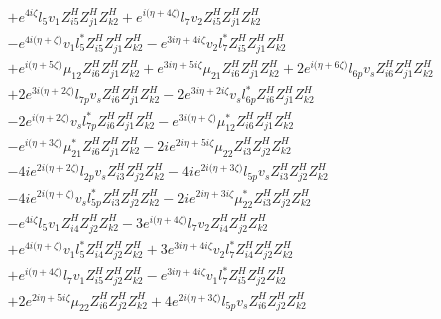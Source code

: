 \begin{align}
 &+e^{4 i \zeta } l_5 v_1 Z_{{i 5}}^{H} Z_{{j 1}}^{H} Z_{{k 2}}^{H} +e^{i \Big(\eta +4 \zeta \Big)} l_7 v_2 Z_{{i 5}}^{H} Z_{{j 1}}^{H} Z_{{k 2}}^{H} \nonumber \\ 
 &- e^{4 i \Big(\eta +\zeta \Big)} v_1 l_5^* Z_{{i 5}}^{H} Z_{{j 1}}^{H} Z_{{k 2}}^{H} - e^{3 i \eta +4 i \zeta } v_2 l_7^* Z_{{i 5}}^{H} Z_{{j 1}}^{H} Z_{{k 2}}^{H} \nonumber \\ 
 &+e^{i \Big(\eta +5 \zeta \Big)} \mu_{12} Z_{{i 6}}^{H} Z_{{j 1}}^{H} Z_{{k 2}}^{H} +e^{3 i \eta +5 i \zeta } \mu_{21} Z_{{i 6}}^{H} Z_{{j 1}}^{H} Z_{{k 2}}^{H} +2 e^{i \Big(\eta +6 \zeta \Big)} l_{6p} v_s Z_{{i 6}}^{H} Z_{{j 1}}^{H} Z_{{k 2}}^{H} \nonumber \\ 
 &+2 e^{3 i \Big(\eta +2 \zeta \Big)} l_{7p} v_s Z_{{i 6}}^{H} Z_{{j 1}}^{H} Z_{{k 2}}^{H} -2 e^{3 i \eta +2 i \zeta } v_s l_{6p}^* Z_{{i 6}}^{H} Z_{{j 1}}^{H} Z_{{k 2}}^{H} \nonumber \\ 
 &-2 e^{i \Big(\eta +2 \zeta \Big)} v_s l_{7p}^* Z_{{i 6}}^{H} Z_{{j 1}}^{H} Z_{{k 2}}^{H} - e^{3 i \Big(\eta +\zeta \Big)} \mu_{12}^* Z_{{i 6}}^{H} Z_{{j 1}}^{H} Z_{{k 2}}^{H} \nonumber \\ 
 &- e^{i \Big(\eta +3 \zeta \Big)} \mu_{21}^* Z_{{i 6}}^{H} Z_{{j 1}}^{H} Z_{{k 2}}^{H} -2 i e^{2 i \eta +5 i \zeta } \mu_{22} Z_{{i 3}}^{H} Z_{{j 2}}^{H} Z_{{k 2}}^{H} \nonumber \\ 
 &-4 i e^{2 i \Big(\eta +2 \zeta \Big)} l_{2p} v_s Z_{{i 3}}^{H} Z_{{j 2}}^{H} Z_{{k 2}}^{H} -4 i e^{2 i \Big(\eta +3 \zeta \Big)} l_{5p} v_s Z_{{i 3}}^{H} Z_{{j 2}}^{H} Z_{{k 2}}^{H} \nonumber \\ 
 &-4 i e^{2 i \Big(\eta +\zeta \Big)} v_s l_{5p}^* Z_{{i 3}}^{H} Z_{{j 2}}^{H} Z_{{k 2}}^{H} -2 i e^{2 i \eta +3 i \zeta } \mu_{22}^* Z_{{i 3}}^{H} Z_{{j 2}}^{H} Z_{{k 2}}^{H} \nonumber \\ 
 &- e^{4 i \zeta } l_5 v_1 Z_{{i 4}}^{H} Z_{{j 2}}^{H} Z_{{k 2}}^{H} -3 e^{i \Big(\eta +4 \zeta \Big)} l_7 v_2 Z_{{i 4}}^{H} Z_{{j 2}}^{H} Z_{{k 2}}^{H} \nonumber \\ 
 &+e^{4 i \Big(\eta +\zeta \Big)} v_1 l_5^* Z_{{i 4}}^{H} Z_{{j 2}}^{H} Z_{{k 2}}^{H} +3 e^{3 i \eta +4 i \zeta } v_2 l_7^* Z_{{i 4}}^{H} Z_{{j 2}}^{H} Z_{{k 2}}^{H} \nonumber \\ 
 &+e^{i \Big(\eta +4 \zeta \Big)} l_7 v_1 Z_{{i 5}}^{H} Z_{{j 2}}^{H} Z_{{k 2}}^{H} - e^{3 i \eta +4 i \zeta } v_1 l_7^* Z_{{i 5}}^{H} Z_{{j 2}}^{H} Z_{{k 2}}^{H} \nonumber \\ 
 &+2 e^{2 i \eta +5 i \zeta } \mu_{22} Z_{{i 6}}^{H} Z_{{j 2}}^{H} Z_{{k 2}}^{H} +4 e^{2 i \Big(\eta +3 \zeta \Big)} l_{5p} v_s Z_{{i 6}}^{H} Z_{{j 2}}^{H} Z_{{k 2}}^{H} \nonumber \\ 

\end{align}
